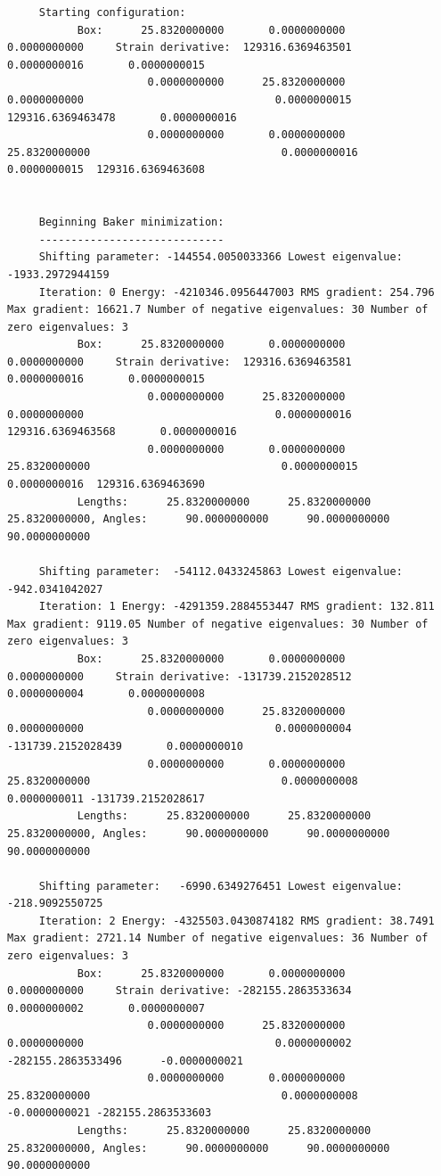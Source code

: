\begin{tiny}
\begin{verbatim}
     Starting configuration:
           Box:      25.8320000000       0.0000000000       0.0000000000     Strain derivative:  129316.6369463501       0.0000000016       0.0000000015
                      0.0000000000      25.8320000000       0.0000000000                              0.0000000015  129316.6369463478       0.0000000016
                      0.0000000000       0.0000000000      25.8320000000                              0.0000000016       0.0000000015  129316.6369463608


     Beginning Baker minimization:
     -----------------------------
     Shifting parameter: -144554.0050033366 Lowest eigenvalue:   -1933.2972944159
     Iteration: 0 Energy: -4210346.0956447003 RMS gradient: 254.796  Max gradient: 16621.7 Number of negative eigenvalues: 30 Number of zero eigenvalues: 3
           Box:      25.8320000000       0.0000000000       0.0000000000     Strain derivative:  129316.6369463581       0.0000000016       0.0000000015
                      0.0000000000      25.8320000000       0.0000000000                              0.0000000016  129316.6369463568       0.0000000016
                      0.0000000000       0.0000000000      25.8320000000                              0.0000000015       0.0000000016  129316.6369463690
           Lengths:      25.8320000000      25.8320000000      25.8320000000, Angles:      90.0000000000      90.0000000000      90.0000000000

     Shifting parameter:  -54112.0433245863 Lowest eigenvalue:    -942.0341042027
     Iteration: 1 Energy: -4291359.2884553447 RMS gradient: 132.811  Max gradient: 9119.05 Number of negative eigenvalues: 30 Number of zero eigenvalues: 3
           Box:      25.8320000000       0.0000000000       0.0000000000     Strain derivative: -131739.2152028512       0.0000000004       0.0000000008
                      0.0000000000      25.8320000000       0.0000000000                              0.0000000004 -131739.2152028439       0.0000000010
                      0.0000000000       0.0000000000      25.8320000000                              0.0000000008       0.0000000011 -131739.2152028617
           Lengths:      25.8320000000      25.8320000000      25.8320000000, Angles:      90.0000000000      90.0000000000      90.0000000000

     Shifting parameter:   -6990.6349276451 Lowest eigenvalue:    -218.9092550725
     Iteration: 2 Energy: -4325503.0430874182 RMS gradient: 38.7491  Max gradient: 2721.14 Number of negative eigenvalues: 36 Number of zero eigenvalues: 3
           Box:      25.8320000000       0.0000000000       0.0000000000     Strain derivative: -282155.2863533634       0.0000000002       0.0000000007
                      0.0000000000      25.8320000000       0.0000000000                              0.0000000002 -282155.2863533496      -0.0000000021
                      0.0000000000       0.0000000000      25.8320000000                              0.0000000008      -0.0000000021 -282155.2863533603
           Lengths:      25.8320000000      25.8320000000      25.8320000000, Angles:      90.0000000000      90.0000000000      90.0000000000


\end{verbatim}
\end{tiny}
